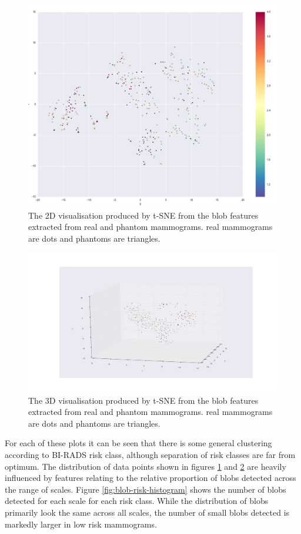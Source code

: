 \begin{figure}
	\label{fig:blob-mapping}
	\centering
	\includegraphics[width=.8\textwidth]{Images/blob-mapping.png}	
	\caption{The 2D visualisation produced by t-SNE from the blob features extracted from real and phantom mammograms. real mammograms are dots and phantoms are triangles.}
\end{figure}

\begin{figure}
	\label{fig:blob-mapping3d}
	\centering
	\includegraphics[width=1.0\textwidth]{Images/blob-mapping3d.png}	
	\caption{The 3D visualisation produced by t-SNE from the blob features extracted from real and phantom mammograms. real mammograms are dots and phantoms are triangles.}
\end{figure}

For each of these plots it can be seen that there is some general clustering according to BI-RADS risk class, although separation of risk classes are far from optimum. The distribution of data points shown in figures \ref{fig:blob-mapping} and \ref{fig:blob-mapping3d} are heavily influenced by features relating to the relative proportion of blobs detected across the range of scales. Figure \ref{fig:blob-risk-histogram} shows the number of blobs detected for each scale for each risk class. While the distribution of blobs primarily look the same across all scales, the number of small blobs detected is markedly larger in low risk mammograms.

